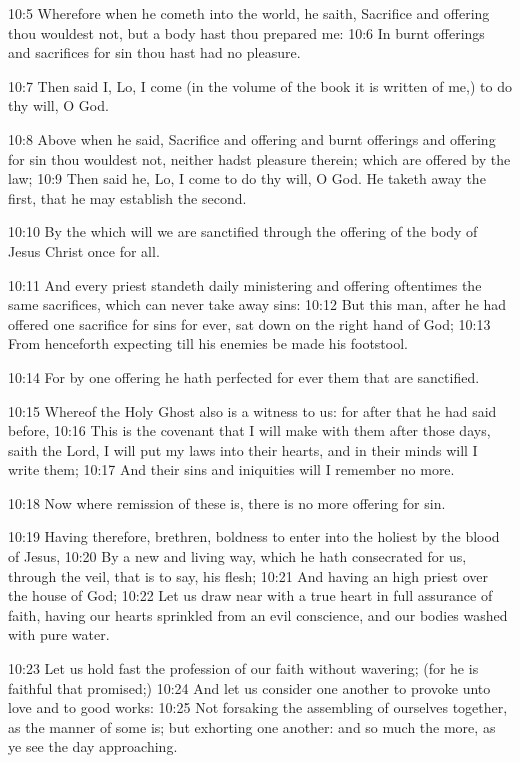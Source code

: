 10:5 Wherefore when he cometh into the world, he saith, Sacrifice and
offering thou wouldest not, but a body hast thou prepared me: 10:6 In
burnt offerings and sacrifices for sin thou hast had no pleasure.

10:7 Then said I, Lo, I come (in the volume of the book it is written
of me,) to do thy will, O God.

10:8 Above when he said, Sacrifice and offering and burnt offerings
and offering for sin thou wouldest not, neither hadst pleasure
therein; which are offered by the law; 10:9 Then said he, Lo, I come
to do thy will, O God. He taketh away the first, that he may establish
the second.

10:10 By the which will we are sanctified through the offering of the
body of Jesus Christ once for all.

10:11 And every priest standeth daily ministering and offering
oftentimes the same sacrifices, which can never take away sins: 10:12
But this man, after he had offered one sacrifice for sins for ever,
sat down on the right hand of God; 10:13 From henceforth expecting
till his enemies be made his footstool.

10:14 For by one offering he hath perfected for ever them that are
sanctified.

10:15 Whereof the Holy Ghost also is a witness to us: for after that
he had said before, 10:16 This is the covenant that I will make with
them after those days, saith the Lord, I will put my laws into their
hearts, and in their minds will I write them; 10:17 And their sins and
iniquities will I remember no more.

10:18 Now where remission of these is, there is no more offering for
sin.

10:19 Having therefore, brethren, boldness to enter into the holiest
by the blood of Jesus, 10:20 By a new and living way, which he hath
consecrated for us, through the veil, that is to say, his flesh; 10:21
And having an high priest over the house of God; 10:22 Let us draw
near with a true heart in full assurance of faith, having our hearts
sprinkled from an evil conscience, and our bodies washed with pure
water.

10:23 Let us hold fast the profession of our faith without wavering;
(for he is faithful that promised;) 10:24 And let us consider one
another to provoke unto love and to good works: 10:25 Not forsaking
the assembling of ourselves together, as the manner of some is; but
exhorting one another: and so much the more, as ye see the day
approaching.

